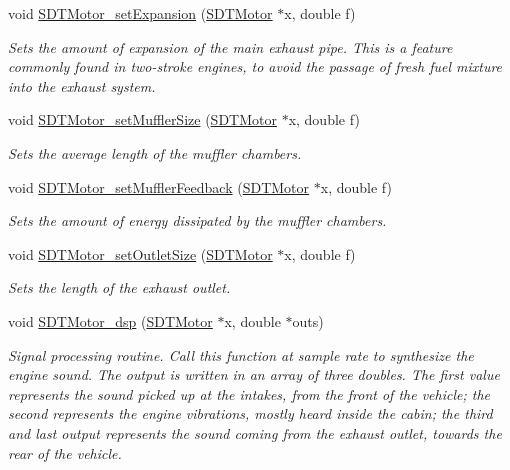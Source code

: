 \begin{DoxyCompactItemize}
void \hyperlink{group__motor_ga72480c08c712aace30be07d8a1b63ad0}{S\+D\+T\+Motor\+\_\+set\+Expansion} (\hyperlink{group__motor_ga71a2e0e68d27c741a163f1b9819acb1b}{S\+D\+T\+Motor} $\ast$x, double f)
\begin{DoxyCompactList}\small\item\em Sets the amount of expansion of the main exhaust pipe. This is a feature commonly found in two-\/stroke engines, to avoid the passage of fresh fuel mixture into the exhaust system. \end{DoxyCompactList}\item 
void \hyperlink{group__motor_ga7c5e374c07941b8801cd96667a641e2c}{S\+D\+T\+Motor\+\_\+set\+Muffler\+Size} (\hyperlink{group__motor_ga71a2e0e68d27c741a163f1b9819acb1b}{S\+D\+T\+Motor} $\ast$x, double f)
\begin{DoxyCompactList}\small\item\em Sets the average length of the muffler chambers. \end{DoxyCompactList}\item 
void \hyperlink{group__motor_ga6c62a51a0682eedfeb8a45617894f0b7}{S\+D\+T\+Motor\+\_\+set\+Muffler\+Feedback} (\hyperlink{group__motor_ga71a2e0e68d27c741a163f1b9819acb1b}{S\+D\+T\+Motor} $\ast$x, double f)
\begin{DoxyCompactList}\small\item\em Sets the amount of energy dissipated by the muffler chambers. \end{DoxyCompactList}\item 
void \hyperlink{group__motor_gace132edd2c286707ad518e5b83e57fbd}{S\+D\+T\+Motor\+\_\+set\+Outlet\+Size} (\hyperlink{group__motor_ga71a2e0e68d27c741a163f1b9819acb1b}{S\+D\+T\+Motor} $\ast$x, double f)
\begin{DoxyCompactList}\small\item\em Sets the length of the exhaust outlet. \end{DoxyCompactList}\item 
void \hyperlink{group__motor_ga35ecc975f9677666d422b51cac470ac5}{S\+D\+T\+Motor\+\_\+dsp} (\hyperlink{group__motor_ga71a2e0e68d27c741a163f1b9819acb1b}{S\+D\+T\+Motor} $\ast$x, double $\ast$outs)
\begin{DoxyCompactList}\small\item\em Signal processing routine. Call this function at sample rate to synthesize the engine sound. The output is written in an array of three doubles. The first value represents the sound picked up at the intakes, from the front of the vehicle; the second represents the engine vibrations, mostly heard inside the cabin; the third and last output represents the sound coming from the exhaust outlet, towards the rear of the vehicle. \end{DoxyCompactList}\end{DoxyCompactItemize}


